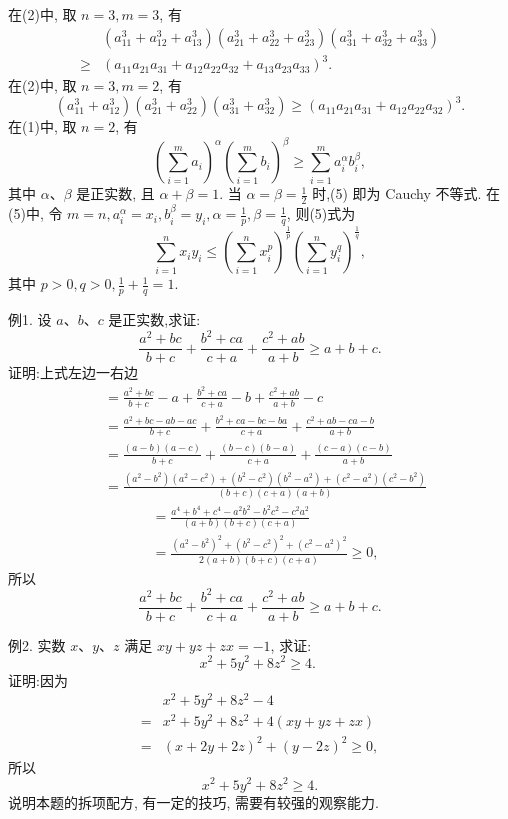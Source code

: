 在(2)中, 取 $n=3, m=3$, 有
$$
\begin{aligned}
& \left(a_{11}^3+a_{12}^3+a_{13}^3\right)\left(a_{21}^3+a_{22}^3+a_{23}^3\right)\left(a_{31}^3+a_{32}^3+a_{33}^3\right) \\
\geqslant & \left(a_{11} a_{21} a_{31}+a_{12} a_{22} a_{32}+a_{13} a_{23} a_{33}\right)^3 . \label{(3)}
\end{aligned}
$$
在(2)中, 取 $n=3, m=2$, 有
$$
\left(a_{11}^3+a_{12}^3\right)\left(a_{21}^3+a_{22}^3\right)\left(a_{31}^3+a_{32}^3\right) \geqslant\left(a_{11} a_{21} a_{31}+a_{12} a_{22} a_{32}\right)^3 . \label{(4)}
$$
在(1)中, 取 $n=2$, 有
$$
\left(\sum_{i=1}^m a_i\right)^\alpha\left(\sum_{i=1}^m b_i\right)^\beta \geqslant \sum_{i=1}^m a_i^\alpha b_i^\beta, \label{(5)}
$$
其中 $\alpha 、 \beta$ 是正实数, 且 $\alpha+\beta=1$. 当 $\alpha=\beta=\frac{1}{2}$ 时,(5) 即为 Cauchy 不等式.
在(5)中, 令 $m=n, a_i^\alpha=x_i, b_i^\beta=y_i, \alpha=\frac{1}{p}, \beta=\frac{1}{q}$, 则(5)式为
$$
\sum_{i=1}^n x_i y_i \leqslant\left(\sum_{i=1}^n x_i^p\right)^{\frac{1}{p}}\left(\sum_{i=1}^n y_i^q\right)^{\frac{1}{q}}, \label{(6)}
$$
其中 $p>0, q>0, \frac{1}{p}+\frac{1}{q}=1$.



例1. 设 $a 、 b 、 c$ 是正实数,求证:
$$
\frac{a^2+b c}{b+c}+\frac{b^2+c a}{c+a}+\frac{c^2+a b}{a+b} \geqslant a+b+c .
$$
证明:上式左边一右边
$$
\begin{aligned}
& =\frac{a^2+b c}{b+c}-a+\frac{b^2+c a}{c+a}-b+\frac{c^2+a b}{a+b}-c \\
& =\frac{a^2+b c-a b-a c}{b+c}+\frac{b^2+c a-b c-b a}{c+a}+\frac{c^2+a b-c a-b}{a+b} \\
& =\frac{(a-b)(a-c)}{b+c}+\frac{(b-c)(b-a)}{c+a}+\frac{(c-a)(c-b)}{a+b} \\
& =\frac{\left(a^2-b^2\right)\left(a^2-c^2\right)+\left(b^2-c^2\right)\left(b^2-a^2\right)+\left(c^2-a^2\right)\left(c^2-b^2\right)}{(b+c)(c+a)(a+b)}
\end{aligned}
$$
$$
\begin{aligned}
& =\frac{a^4+b^4+c^4-a^2 b^2-b^2 c^2-c^2 a^2}{(a+b)(b+c)(c+a)} \\
& =\frac{\left(a^2-b^2\right)^2+\left(b^2-c^2\right)^2+\left(c^2-a^2\right)^2}{2(a+b)(b+c)(c+a)} \geqslant 0,
\end{aligned}
$$
所以
$$
\frac{a^2+b c}{b+c}+\frac{b^2+c a}{c+a}+\frac{c^2+a b}{a+b} \geqslant a+b+c .
$$



例2. 实数 $x 、 y 、 z$ 满足 $x y+y z+z x=-1$, 求证:
$$
x^2+5 y^2+8 z^2 \geqslant 4 \text {. }
$$
证明:因为
$$
\begin{aligned}
& x^2+5 y^2+8 z^2-4 \\
= & x^2+5 y^2+8 z^2+4(x y+y z+z x) \\
= & (x+2 y+2 z)^2+(y-2 z)^2 \geqslant 0,
\end{aligned}
$$
所以
$$
x^2+5 y^2+8 z^2 \geqslant 4 .
$$
说明本题的拆项配方, 有一定的技巧, 需要有较强的观察能力.



